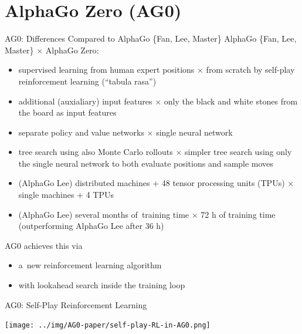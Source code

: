 \documentclass{beamer}
\begin{document}
  \section{AlphaGo Zero (AG0)}
  {

    \begin{frame}{AG0: Differences Compared to AlphaGo \{Fan, Lee, Master\}}
      AlphaGo \{Fan, Lee, Master\} $\times$ \alert{AlphaGo Zero}:
      \pause
      \begin{itemize}[<+->]
        \item supervised learning from human expert positions $\times$ \alert{from scratch by self-play reinforcement learning (``tabula rasa'')}
        \item additional (auxialiary) input features $\times$ \alert{only the black and white stones from the board as input features}
        \item separate policy and value networks $\times$ \alert{single neural network}
        \item tree search using also Monte Carlo rollouts $\times$ \alert{simpler tree search using only the single neural network to both evaluate positions and sample moves}
        \item (AlphaGo Lee) distributed machines + 48 tensor processing units (TPUs) $\times$ \alert{single machines + 4 TPUs}
        \item (AlphaGo Lee) several months of~training time $\times$ \alert{72 h of training time (outperforming AlphaGo Lee after 36 h)}
      \end{itemize}
    \end{frame}

    \begin{frame}
      AG0 achieves this via
      \pause
      \begin{itemize}[<+->]
        \item a~new \alert{reinforcement learning} algorithm
        \item with \alert{lookahead search inside the training loop}
      \end{itemize}
    \end{frame}

    \begin{frame}{AG0: Self-Play Reinforcement Learning}
      \pause
      \begin{center}
        \texttt{[image: ../img/AG0-paper/self-play-RL-in-AG0.png]}
      \end{center}
    \end{frame}

}
\end{document}
